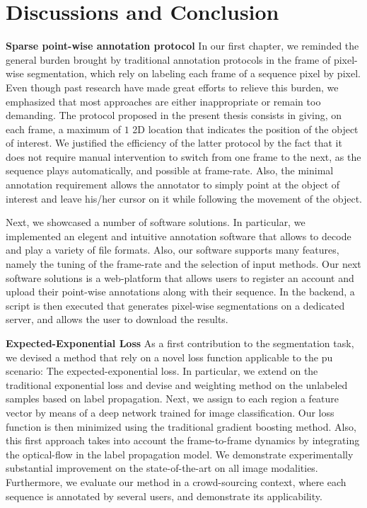 \section{Discussions and Conclusion}

\textbf{Sparse point-wise annotation protocol}
In our first chapter, we reminded the general burden brought by traditional annotation protocols in the frame of pixel-wise segmentation, which rely on labeling each frame of a sequence pixel by pixel.
Even though past research have made great efforts to relieve this burden, we emphasized that most approaches are either inappropriate or remain too demanding.
The protocol proposed in the present thesis consists in giving, on each frame, a maximum of $1$ 2D location that indicates the position of the object of interest.
We justified the efficiency of the latter protocol by the fact that it does not require manual intervention to switch from one frame to the next, as the sequence plays automatically, and possible at frame-rate.
Also, the minimal annotation requirement allows the annotator to simply point at the object of interest and leave his/her cursor on it while following the movement of the object.

Next, we showcased a number of software solutions.
In particular, we implemented an elegent and intuitive annotation software that allows to decode and play a variety of file formats.
Also, our software supports many features, namely the tuning of the frame-rate and the selection of input methods.
Our next software solutions is a web-platform that allows users to register an account and upload their point-wise annotations along with their sequence.
In the backend, a script is then executed that generates pixel-wise segmentations on a dedicated server, and allows the user to download the results.

\textbf{Expected-Exponential Loss}
As a first contribution to the segmentation task, we devised a method that rely on a novel loss function applicable to the \gls{pu} scenario: The expected-exponential loss.
In particular, we extend on the traditional exponential loss and devise and weighting method on the unlabeled samples based on label propagation.
Next, we assign to each region a feature vector by means of a deep network trained for image classification.
Our loss function is then minimized using the traditional gradient boosting method.
Also, this first approach takes into account the frame-to-frame dynamics by integrating the optical-flow in the label propagation model.
We demonstrate experimentally substantial improvement on the state-of-the-art on all image modalities.
Furthermore, we evaluate our method in a crowd-sourcing context, where each sequence is annotated by several users, and demonstrate its applicability.

